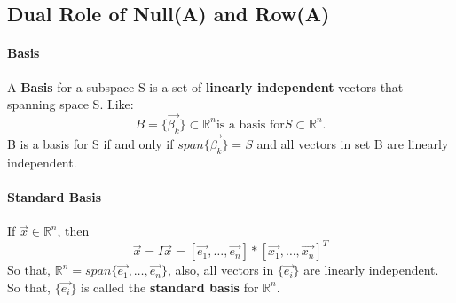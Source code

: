\documentclass{article}
\begin{document}
	\subsection{Dual Role of Null(A) and Row(A)}
	\paragraph{Basis} A \textbf{Basis} for a subspace S is a set of \textbf{linearly independent} vectors that spanning space S.
	\newline Like:
	\[B = \{\vec{\beta_k}\} \subset \mathbb{R} ^ n \text{is a basis for} S \subset \mathbb{R} ^ n.
	\]
	B is a basis for S if and only if $span\{\vec{\beta_k}\} = S$ and all vectors in set B are linearly independent.
	\paragraph{Standard Basis} If $\vec{x} \in \mathbb{R}^n$, then
	\[
	\vec{x} = I \vec{x} = [\vec{e_1},\ldots,\vec{e_n}] * [\vec{x_1},\ldots,\vec{x_n}]^T
	\]
	So that, $\mathbb{R}^n = span\{\vec{e_1},\ldots,\vec{e_n}\}$, also, all vectors in $\{\vec{e_i}\}$ are linearly independent. So that, $\{\vec{e_i}\}$ is called the \textbf{standard basis} for $\mathbb{R} ^ n$.
 
\end{document}
